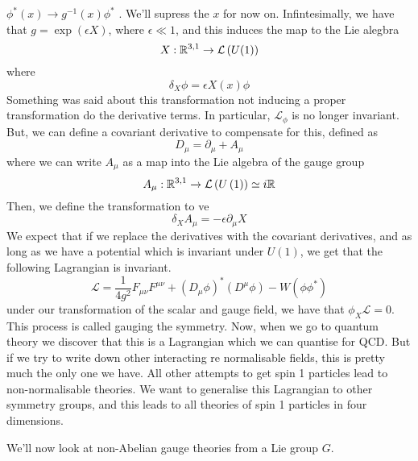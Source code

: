 $ \phi ^ * (  x) \to g ^{ -1  } ( x ) \phi ^ * $ . 
We'll supress the $ x $ for now on. 
Infintesimally, we have that $ g = \exp\left( \epsilon X  \right)  $, 
where $ \epsilon \ll 1 $, and this induces 
the map to the Lie alegbra 
\[
	X : \mathbb{R} ^{ 3, 1 } \to \mathcal{ L } \left( U ( 1 )  \right)  
\] where 
\[
 \delta _ X \phi = \epsilon X ( x ) \phi 
\] Something was said about this 
transformation not inducing a 
proper transformation do the derivative terms. 
In particular,  $ \mathcal{ L } _ \phi $ 
is no longer invariant. But, we can 
define a covariant derivative to 
compensate for this, defined as 
\[
 D _{ \mu } = \partial  _ \mu + A _ \mu 
\]  where we can write $ A _ \mu $ 
as a map into the Lie algebra of the gauge group 
\[
	A _ \mu : \mathbb{R}^{ 3, 1 } \to \mathcal{ L } \left( U \left( 1  \right)   \right) \simeq i \mathbb{R} 
\] Then, we define the transformation 
to ve 
\[
 \delta _ X A _ \mu  =  - \epsilon \partial  _ \mu X 
\] We expect that if we replace the 
derivatives with the covariant derivatives, 
and as long as we have a potential which 
is invariant under $ U ( 1 ) $, we get that 
the following Lagrangian is invariant. 
\[
 \mathcal{ L }  = \frac{1}{4 g ^  2} F _{ \mu \nu } F ^{ \mu \nu } 
 + \left( D _ \mu \phi  \right)  ^ * \left( D ^ \mu \phi  \right)  
  - W \left( \phi \phi ^ *  \right) 
\] under our transformation of the scalar and gauge field, 
we have that $ \phi _ X \mathcal{ L }  = 0$. 
This process is called gauging the symmetry. 
Now, when we go to quantum theory we 
discover that this is a Lagrangian which 
we can quantise for QCD. But if 
we try to write down other interacting re normalisable 
fields, this is pretty much the only one we have. 
All other attempts to get spin 1 particles 
lead to non-normalisable theories. 
We want to generalise this Lagrangian 
to other symmetry groups, and this 
leads to all theories of spin 1 particles 
in four dimensions. 

We'll now look at 
non-Abelian gauge theories from a Lie group $ G $. 

